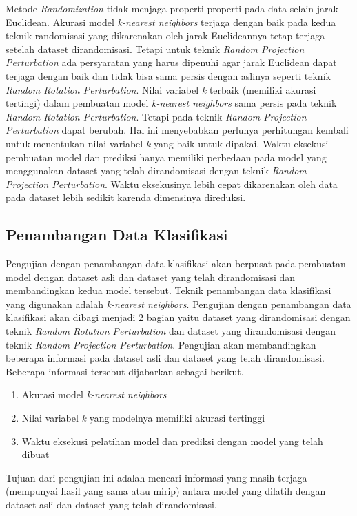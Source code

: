 Metode \textit{Randomization} tidak menjaga properti-properti pada data selain jarak Euclidean. Akurasi model \textit{k-nearest neighbors} terjaga dengan baik pada kedua teknik randomisasi yang dikarenakan oleh jarak Euclideannya tetap terjaga setelah dataset dirandomisasi. Tetapi untuk teknik \textit{Random Projection Perturbation} ada persyaratan yang harus dipenuhi agar jarak Euclidean dapat terjaga dengan baik dan tidak bisa sama persis dengan aslinya seperti teknik \textit{Random Rotation Perturbation}. Nilai variabel \textit{k} terbaik (memiliki akurasi tertingi) dalam pembuatan model \textit{k-nearest neighbors} sama persis pada teknik \textit{Random Rotation Perturbation}. Tetapi pada teknik \textit{Random Projection Perturbation} dapat berubah. Hal ini menyebabkan perlunya perhitungan kembali untuk menentukan nilai variabel \textit{k} yang baik untuk dipakai. Waktu eksekusi pembuatan model dan prediksi hanya memiliki perbedaan pada model yang menggunakan dataset yang telah dirandomisasi dengan teknik \textit{Random Projection Perturbation}. Waktu eksekusinya lebih cepat dikarenakan oleh data pada dataset lebih sedikit karenda dimensinya direduksi.

\subsection{Penambangan Data Klasifikasi}
\label{subsec:pengujian-klasifikasi}
Pengujian dengan penambangan data klasifikasi akan berpusat pada pembuatan model dengan dataset asli dan dataset yang telah dirandomisasi dan membandingkan kedua model tersebut. Teknik penambangan data klasifikasi yang digunakan adalah \textit{k-nearest neighbors}. Pengujian dengan penambangan data klasifikasi akan dibagi menjadi 2 bagian yaitu dataset yang dirandomisasi dengan teknik \textit{Random Rotation Perturbation} dan dataset yang dirandomisasi dengan teknik \textit{Random Projection Perturbation}. Pengujian akan membandingkan beberapa informasi pada dataset asli dan dataset yang telah dirandomisasi. Beberapa informasi tersebut dijabarkan sebagai berikut.
\begin{enumerate}
	\item Akurasi model \textit{k-nearest neighbors}
	\item Nilai variabel \textit{k} yang modelnya memiliki akurasi tertinggi
	\item Waktu eksekusi pelatihan model dan prediksi dengan model yang telah dibuat
\end{enumerate}
Tujuan dari pengujian ini adalah mencari informasi yang masih terjaga (mempunyai hasil yang sama atau mirip) antara model yang dilatih dengan dataset asli dan dataset yang telah dirandomisasi.

